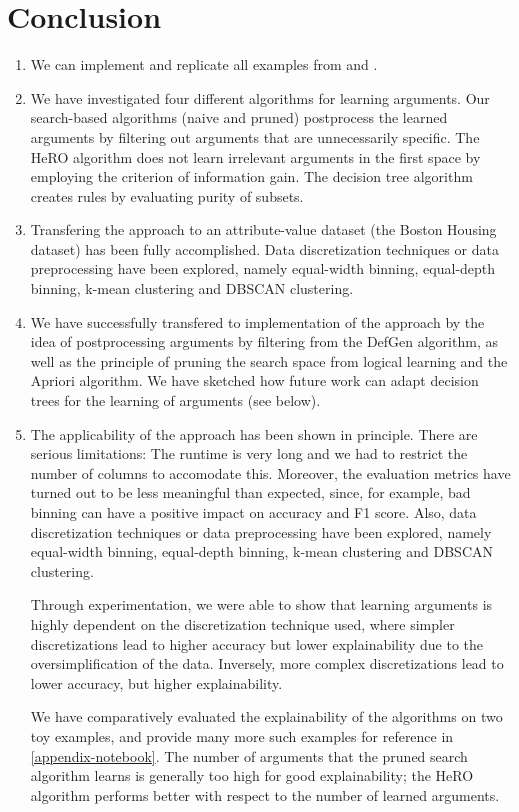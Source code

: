 \chapter{Conclusion}

\begin{enumerate}
    \item We can implement and replicate all examples from \cite{verheijProofProbabilities2017} and \cite{verheijAnalyzingSimonshavenCase2020}. 
    \item We have investigated four different algorithms for learning arguments. Our search-based algorithms (naive and pruned) postprocess the learned arguments by filtering out arguments that are unnecessarily specific. The HeRO algorithm does not learn irrelevant arguments in the first space by employing the criterion of information gain. %
    The decision tree algorithm creates rules by evaluating purity of subsets.
    \item Transfering the approach to an attribute-value dataset (the Boston Housing dataset) has been fully accomplished. Data discretization techniques or data preprocessing have been explored, namely equal-width binning, equal-depth binning, k-mean clustering and DBSCAN clustering.
    \item We have successfully transfered to implementation of the approach by \cite{verheijProofProbabilities2017} the idea of postprocessing arguments by filtering from the DefGen algorithm, as well as the principle of pruning the search space from logical learning and the Apriori algorithm. We have sketched how future work can adapt decision trees for the learning of arguments (see below).
    \item The applicability of the approach has been shown in principle. There are serious limitations: The runtime is very long and we had to restrict the number of columns to accomodate this. Moreover, the evaluation metrics have turned out to be less meaningful than expected, since, for example, bad binning can have a positive impact on accuracy and F1 score. Also, data discretization techniques or data preprocessing have been explored, namely equal-width binning, equal-depth binning, k-mean clustering and DBSCAN clustering.
    
    Through experimentation, we were able to show that learning arguments is highly dependent on the discretization technique used, where simpler discretizations lead to higher accuracy but lower explainability due to the oversimplification of the data. Inversely, more complex discretizations lead to lower accuracy, but higher explainability.
    
    We have comparatively evaluated the explainability of the algorithms on two toy examples, and provide many more such examples for reference in \autoref{appendix-notebook}. The number of arguments that the pruned search algorithm learns is generally too high for good explainability; the HeRO algorithm performs better with respect to the number of learned arguments.
\end{enumerate}




